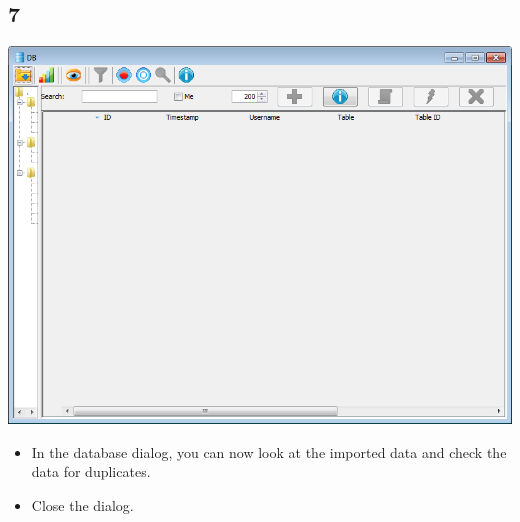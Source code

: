 \documentclass{beamer}
\begin{document}
\subsection{7}
\begin{frame}
	\begin{center}
  		\includegraphics[height=0.6\textheight]{7.png}
	\end{center}
	\begin{itemize}
		\item In the database dialog, you can now look at the imported data and check the data for duplicates.
		\item Close the dialog.
	\end{itemize}
\end{frame}
\end{document}
